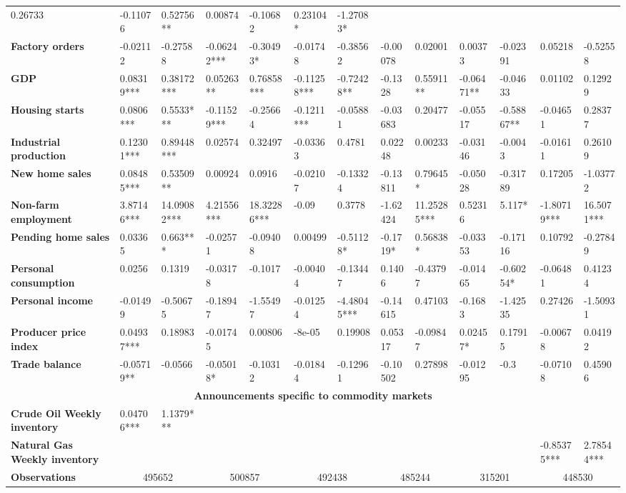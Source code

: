 \begin{sidewaystable}
{\begin{tabular}{@{}lllllllllllll@{}}
0.26733 & -0.11076 & 0.52756** & 0.00874 & -0.10682 & 0.23104* & -1.27083* \\ \textbf{Factory orders}& -0.02112 & -0.27588 & -0.06242*** & -0.30493* & -0.01748 & -0.38562 & -0.00078 & 0.02001 & 0.00373 & -0.02391 & 0.05218 & -0.52558 \\ \textbf{GDP}& 0.08319*** & 0.38172*** & 0.05263** & 0.76858*** & -0.11258*** & -0.72428** & -0.1328 & 0.55911** & -0.06471** & -0.04633 & 0.01102 & 0.12929 \\ \textbf{Housing starts}& 0.0806*** & 0.5533*** & -0.11529*** & -0.25664 & -0.1211*** & -0.05881 & -0.03683 & 0.20477 & -0.05517 & -0.58867** & -0.04651 & 0.28377 \\ \textbf{Industrial production}& 0.12301*** & 0.89448*** & 0.02574 & 0.32497 & -0.03363 & 0.4781 & 0.02248 & 0.00233 & -0.03146 & -0.0043 & -0.01611 & 0.26109 \\ \textbf{New home sales}& 0.08485*** & 0.53509** & 0.00924 & 0.0916 & -0.02107 & -0.13324 & -0.13811 & 0.79645* & -0.05028 & -0.31789 & 0.17205 & -1.03772 \\ \textbf{Non-farm employment}& 3.87146*** & 14.09082*** & 4.21556*** & 18.32286*** & -0.09 & 0.3778 & -1.62424 & 11.25285*** & 0.52316 & 5.117* & -1.80719*** & 16.5071*** \\ \textbf{Pending home sales}& 0.03365 & 0.663*** & -0.02571 & -0.09408 & 0.00499 & -0.51128* & -0.1719* & 0.56838* & -0.03353 & -0.17116 & 0.10792 & -0.27849 \\ \textbf{Personal consumption}& 0.0256 & 0.1319 & -0.03178 & -0.1017 & -0.00404 & -0.13447 & 0.1406 & -0.43797 & -0.01465 & -0.60254* & -0.06481 & 0.41234 \\ \textbf{Personal income}& -0.01499 & -0.50675 & -0.18947 & -1.55497 & -0.01254 & -4.48045*** & -0.14615 & 0.47103 & -0.1683 & -1.42535 & 0.27426 & -1.50931 \\ \textbf{Producer price index}& 0.04937*** & 0.18983 & -0.01745 & 0.00806 & -8e-05 & 0.19908 & 0.05317 & -0.09847 & 0.02457* & 0.17915 & -0.00678 & 0.04192 \\ \textbf{Trade balance}& -0.05719** & -0.0566 & -0.05018* & -0.10312 & -0.01844 & -0.12961 & -0.10502 & 0.27898 & -0.01295 & -0.3 & -0.07108 & 0.45906 \\  \midrule \multicolumn{13}{c}{\textbf{Announcements specific to commodity markets}} \\ \midrule \textbf{Crude Oil Weekly inventory}& 0.04706*** & 1.1379*** &  &  &  &  &  &  &  &  &  &  \\ \textbf{Natural Gas Weekly inventory}&  &  &  &  &  &  &  &  &  &  & -0.85375*** & 2.78544*** \\  \midrule \textbf{Observations}             &\multicolumn{2}{c}{ 495652 }                                                 & \multicolumn{2}{c}{ 500857 }                                                 & \multicolumn{2}{c}{ 492438 }                                                 & \multicolumn{2}{c}{ 485244 }                                                 & \multicolumn{2}{c}{ 315201 }                                                   & \multicolumn{2}{c}{ 448530 }                                 
\end{tabular}}
\end{sidewaystable}
